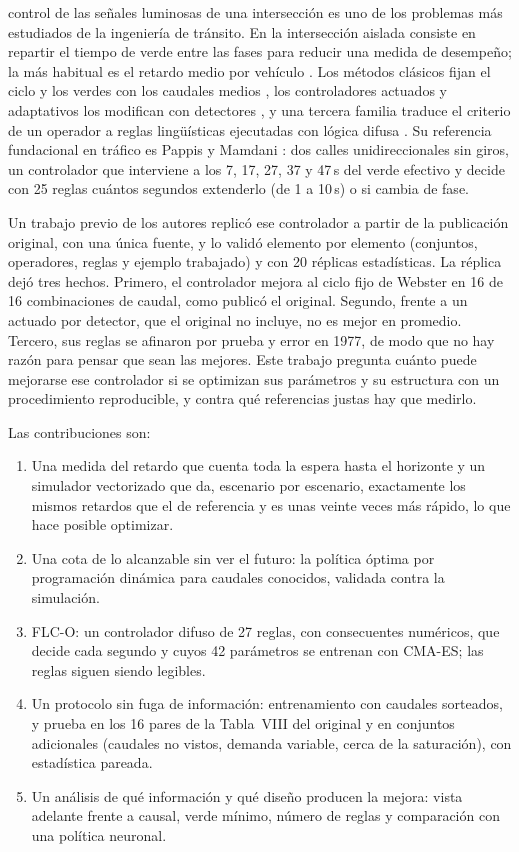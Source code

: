 \documentclass[journal]{IEEEtran}
\newcommand{\FLC}{FLC-O}
\begin{document}
 control de las señales luminosas de una intersección es uno de los problemas más estudiados de la ingeniería de tránsito. En la intersección aislada consiste en repartir el tiempo de verde entre las fases para reducir una medida de desempeño; la más habitual es el retardo medio por vehículo \cite{Pappis1977,Papageorgiou2003}. Los métodos clásicos fijan el ciclo y los verdes con los caudales medios \cite{Webster1958,Webster1966,Miller1963,Allsop1971}, los controladores actuados y adaptativos los modifican con detectores \cite{Hunt1982,Lowrie1982,Mirchandani2001}, y una tercera familia traduce el criterio de un operador a reglas lingüísticas ejecutadas con lógica difusa \cite{Zadeh1965,Zadeh1973,MamdaniAssilian1975}. Su referencia fundacional en tráfico es Pappis y Mamdani \cite{Pappis1977}: dos calles unidireccionales sin giros, un controlador que interviene a los 7, 17, 27, 37 y 47\,s del verde efectivo y decide con 25 reglas cuántos segundos extenderlo (de 1 a 10\,s) o si cambia de fase.

Un trabajo previo de los autores replicó ese controlador a partir de la publicación original, con una única fuente, y lo validó elemento por elemento (conjuntos, operadores, reglas y ejemplo trabajado) y con 20 réplicas estadísticas. La réplica dejó tres hechos. Primero, el controlador mejora al ciclo fijo de Webster en 16 de 16 combinaciones de caudal, como publicó el original. Segundo, frente a un actuado por detector, que el original no incluye, no es mejor en promedio. Tercero, sus reglas se afinaron por prueba y error en 1977, de modo que no hay razón para pensar que sean las mejores. Este trabajo pregunta cuánto puede mejorarse ese controlador si se optimizan sus parámetros y su estructura con un procedimiento reproducible, y contra qué referencias justas hay que medirlo.

Las contribuciones son:
\begin{enumerate}
\item Una medida del retardo que cuenta toda la espera hasta el horizonte y un simulador vectorizado que da, escenario por escenario, exactamente los mismos retardos que el de referencia y es unas veinte veces más rápido, lo que hace posible optimizar.
\item Una cota de lo alcanzable sin ver el futuro: la política óptima por programación dinámica para caudales conocidos, validada contra la simulación.
\item \FLC{}: un controlador difuso de 27 reglas, con consecuentes numéricos, que decide cada segundo y cuyos 42 parámetros se entrenan con CMA-ES; las reglas siguen siendo legibles.
\item Un protocolo sin fuga de información: entrenamiento con caudales sorteados, y prueba en los 16 pares de la Tabla~VIII del original y en conjuntos adicionales (caudales no vistos, demanda variable, cerca de la saturación), con estadística pareada.
\item Un análisis de qué información y qué diseño producen la mejora: vista adelante frente a causal, verde mínimo, número de reglas y comparación con una política neuronal.
\end{enumerate}
\end{document}
